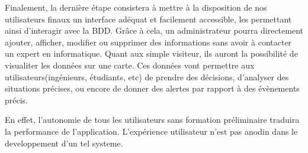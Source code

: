 \par
Finalement, la dernière étape consistera à mettre à la disposition 
de nos utilisateurs finaux un interface adéquat et facilement 
accessible, les permettant ainsi d'interagir avec la BDD. Grâce 
à cela, un administrateur pourra directement ajouter, afficher, modifier ou supprimer 
des informations sans avoir à contacter un expert en informatique.
Quant aux simple visiteur, ils auront la possibilité de visualiter les données sur une carte. 
Ces données vont permettre aux utilisateurs(ingénieurs, étudiants, etc) de prendre des décisions, 
d’analyser des situations précises, ou encore de donner des alertes par rapport à des évènements précis.
\par
En effet, l'autonomie de tous les utilisateurs sans formation préliminaire 
traduira la performance de l'application. L'expérience utilisateur n'est pas anodin dans 
le developpement d'un tel systeme.